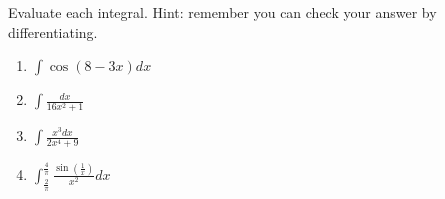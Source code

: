 Evaluate each integral. Hint: remember you can check your answer by differentiating.

\begin{enumerate}

    \item {} $\displaystyle \int \cos \left( 8 - 3x \right) dx$

    \item {} $\displaystyle \int \frac {dx} {16x^2 + 1}$
    
    \item {} $\displaystyle \int \frac {x^3 dx} {2x^4 + 9} $
    
    \item {} $\displaystyle \int _{\frac 2 \pi} ^ {\frac 4 \pi} \frac {\sin \left( \frac 1 x \right)} {x^2} dx$
    
\end{enumerate}